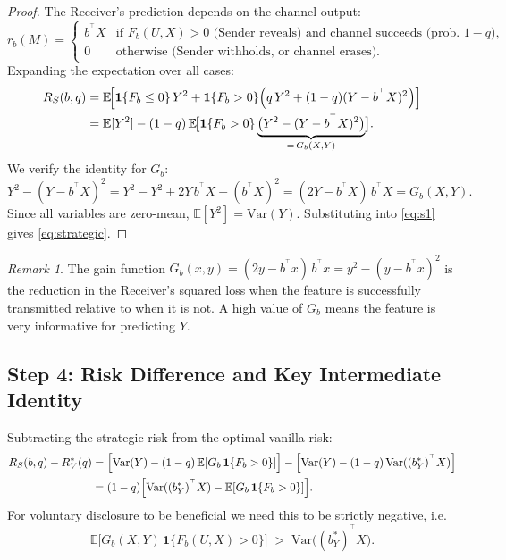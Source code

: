 \documentclass[11pt]{article}
\theoremstyle{definition}
\theoremstyle{remark}
\newtheorem{remark}[theorem]{Remark}
\newcommand{\E}{\mathbb{E}}
\newcommand{\T}{^{\top}}
\begin{document}
\begin{proof}
The Receiver's prediction depends on the channel output:
\[
  r_{b}(M) =
  \begin{cases}
    b^{\T}X & \text{if } F_{b}(U,X)>0 \text{ (Sender reveals) and channel succeeds (prob.\ }1-q),\\
    0        & \text{otherwise (Sender withholds, or channel erases).}
  \end{cases}
\]
Expanding the expectation over all cases:
\begin{align}
  R_{S}(b,q)
  &= \E\!\Bigl[\mathbf{1}\{F_{b}\le 0\}\,Y^{2}
              + \mathbf{1}\{F_{b}>0\}\Bigl(q\,Y^{2}
                +(1-q)(Y-b^{\T}X)^{2}\Bigr)\Bigr] \notag\\
  &= \E[Y^{2}]
     - (1-q)\,\E\!\bigl[\mathbf{1}\{F_{b}>0\}
       \underbrace{\bigl(Y^{2}-(Y-b^{\T}X)^{2}\bigr)}_{=\,G_{b}(X,Y)}\bigr]. \label{eq:s1}
\end{align}
We verify the identity for $G_{b}$:
\[
  Y^{2} - (Y-b^{\T}X)^{2}
  = Y^{2} - Y^{2} + 2Y\,b^{\T}X - (b^{\T}X)^{2}
  = (2Y - b^{\T}X)\,b^{\T}X
  = G_{b}(X,Y).
\]
Since all variables are zero-mean, $\E[Y^{2}]=\mathrm{Var}(Y)$.
Substituting into \eqref{eq:s1} gives \eqref{eq:strategic}.
\end{proof}

\begin{remark}
  The gain function $G_{b}(x,y) = (2y-b^{\T}x)\,b^{\T}x = y^{2}-(y-b^{\T}x)^{2}$
  is the reduction in the Receiver's squared loss when the feature is successfully
  transmitted relative to when it is not.
  A high value of $G_{b}$ means the feature is very informative for predicting $Y$.
\end{remark}

\subsection{Step 4: Risk Difference and Key Intermediate Identity}

Subtracting the strategic risk from the optimal vanilla risk:
\begin{align}
  R_{S}(b,q) - R_{V}^{*}(q)
  &= \Bigl[\mathrm{Var}(Y)-(1-q)\,\E[G_{b}\,\mathbf{1}\{F_{b}>0\}]\Bigr]
     - \Bigl[\mathrm{Var}(Y)-(1-q)\,\mathrm{Var}((b_{Y}^{*})^{\T}X)\Bigr] \notag\\
  &= (1-q)\Bigl[\mathrm{Var}((b_{Y}^{*})^{\T}X)
               - \E[G_{b}\,\mathbf{1}\{F_{b}>0\}]\Bigr]. \label{eq:diff}
\end{align}
For voluntary disclosure to be beneficial we need this to be strictly negative, i.e.\
\begin{equation}\label{eq:want}
  \E\!\bigl[G_{b}(X,Y)\,\mathbf{1}\{F_{b}(U,X)>0\}\bigr]
  \;>\;
  \mathrm{Var}\!\bigl((b_{Y}^{*})^{\T}X\bigr).
\end{equation}
\end{document}
